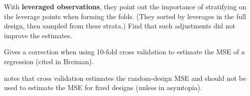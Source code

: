 \documentclass[12pt]{article}
\begin{document}
 With {\bf leveraged observations}, they point out the importance of stratifying
 on the leverage points when forming the folds.  (They sorted by leverages in
 the full design, then sampled from these strata.)  Find that such adjustments
 did not improve the estimates.  


\citet{burman90} Gives a correction when using 10-fold cross validation to
 estimate the MSE of a regression (cited in Breiman).


\citet{efron86} notes that cross validation estimates the random-design MSE and
 should not be used to estimate the MSE for fixed designs (unless in asymtopia).




\end{document}
